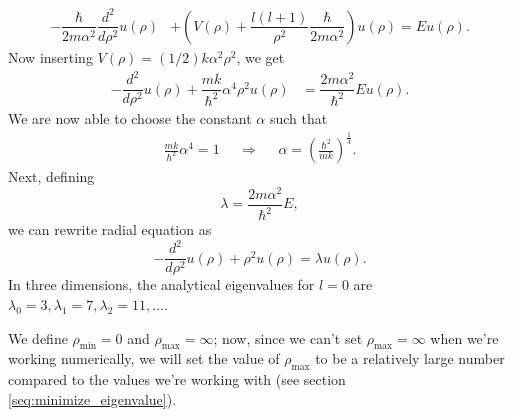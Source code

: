 \documentclass{emulateapj}
\begin{document}
        \begin{align*}
            -\dfrac{\hbar}{2 m \alpha^2} \dfrac{d^2}{d\rho^2} u(\rho)&
            + \left(V(\rho) + \dfrac{l(l + 1)}{\rho^2}\dfrac{\hbar}{2 m \alpha^2}\right) u(\rho) = E u(\rho).
        \end{align*}
        Now inserting \(V(\rho) = (1/2) k \alpha^2 \rho^2\), we get
        \begin{align*}
            -\dfrac{d^2}{d\rho^2} u(\rho) + \dfrac{mk}{\hbar^2} \alpha^4 \rho^2 u(\rho) &= \dfrac{2 m \alpha^2}{\hbar^2} E u(\rho).
        \end{align*}
        We are now able to choose the constant \(\alpha\) such that%
        \begin{align*}
            \frac{m k}{\hbar^2}\alpha^4 = 1 &&\Rightarrow&& \alpha = \left(\frac{\hbar^2}{m k}\right)^{\frac{1}{4}}.
        \end{align*}
        Next, defining
        \begin{equation*}
            \lambda = \dfrac{2 m \alpha^2}{\hbar^2} E,
        \end{equation*}
        we can rewrite radial equation as
        \begin{equation}\label{eq: 1st_Schroedinger}
            - \dfrac{d^2}{d\rho^2} u(\rho) + \rho^2 u(\rho) = \lambda u(\rho).
        \end{equation}
        In three dimensions, the analytical eigenvalues for $l = 0$ are \cite[chapter 4]{griffiths} $\lambda_0 = 3, \lambda_1 = 7, \lambda_2 = 11, \dots$.
        
        We define $\rho_{\text{min}} = 0$ and $\rho_{\text{max}} = \infty$; now, since we can't set $\rho_{\text{max}} = \infty$ when we're working numerically, we will set the value of \(\rho_{\text{max}}\) to be a relatively large number compared to the values we're working with (see section \ref{seq:minimize_eigenvalue}).
        
\end{document}
